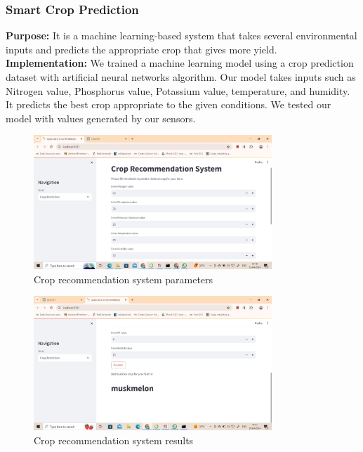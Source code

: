\documentclass{article}
\begin{document}
\subsubsection{Smart Crop Prediction}

\textbf{Purpose:} It is a machine learning-based system that takes several environmental inputs and predicts the appropriate crop that gives more yield.\\
\textbf{Implementation:} We trained a machine learning model using a crop prediction dataset with artificial neural networks algorithm. Our model takes inputs such as Nitrogen value, Phosphorus value, Potassium value, temperature, and humidity. It predicts the best crop appropriate to the given conditions. We tested our model with values generated by our sensors.

\begin{figure}[h]
    \centering
    \includegraphics[width=0.8\textwidth]{crop_recommendation_system.jpg}
    \caption{Crop recommendation system parameters}
    \label{fig:example1}
\end{figure}

\begin{figure}[h]
    \centering
    \includegraphics[width=0.8\textwidth]{crop_recommendation_system1.jpg}
    \caption{Crop recommendation system results}
    \label{fig:example2}
\end{figure}
\end{document}
